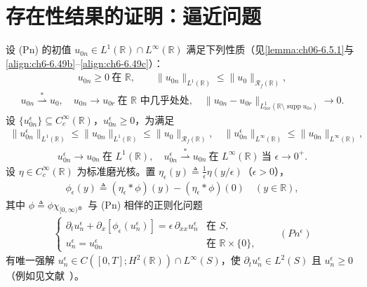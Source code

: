 \documentclass[../../main.tex]{subfiles}%
\begin{document}
\section{存在性结果的证明：逼近问题}\label{section:ch07-逼近问题}

设 (Pn) 的初值 $u_{0n}\in L^1(\mathbb{R})\cap L^\infty(\mathbb{R})$ 满足下列性质（见\cref{lemma:ch06-6.5.1}与\eqref{align:ch6-6.49b}--\eqref{align:ch6-6.49c}）：
\begin{align}
u_{0n}\geqslant0\ \text{在 }\mathbb{R},\qquad
\|u_{0n}\|_{L^1(\mathbb{R})}\leqslant\|u_0\|_{\mathscr{R}_f(\mathbb{R})}, \label{align:ch07-7.44}
\end{align}
\begin{align}
u_{0n}\stackrel{*}{\rightharpoonup}u_0,\quad
u_{0n}\to u_{0r}\ \text{在 }\mathbb{R}\text{ 中几乎处处},\quad
\|u_{0n}-u_{0r}\|_{L^1_{\mathrm{loc}}(\mathbb{R}\setminus\operatorname{supp}u_{0s})}\to0. \label{align:ch07-7.45}
\end{align}
设 $\{u_{0n}^\epsilon\}\subseteq C^\infty_c(\mathbb{R})$，$u_{0n}^\epsilon\geqslant0$，为满足
\begin{align}
\|u_{0n}^\epsilon\|_{L^1(\mathbb{R})}\leqslant\|u_{0n}\|_{L^1(\mathbb{R})}\leqslant\|u_0\|_{\mathscr{R}_f(\mathbb{R})},\quad
\|u_{0n}^\epsilon\|_{L^\infty(\mathbb{R})}\leqslant\|u_{0n}\|_{L^\infty(\mathbb{R})}, \label{align:ch07-7.46}
\end{align}
\begin{align}
u_{0n}^\epsilon\to u_{0n}\ \text{在 }L^1(\mathbb{R}),\quad
u_{0n}^\epsilon\stackrel{*}{\rightharpoonup}u_{0n}\ \text{在 }L^\infty(\mathbb{R})\ \text{当 }\epsilon\to0^+. \label{align:ch07-7.47}
\end{align}
设 $\eta\in C^\infty_c(\mathbb{R})$ 为标准磨光核。置 $\eta_\epsilon(y)\triangleq \frac1\epsilon\eta(y/\epsilon)$（$\epsilon>0$），
\begin{align}
\phi_\epsilon(y)\triangleq (\eta_\epsilon*\phi)(y)-(\eta_\epsilon*\phi)(0)\quad(y\in\mathbb{R}), \label{align:ch07-7.48}
\end{align}
其中 $\phi\triangleq \phi\chi_{[0,\infty)}$。与 (Pn) 相伴的正则化问题
\begin{align*}
\begin{cases}
\partial_t u_n^\epsilon+\partial_x[\phi_\epsilon(u_n^\epsilon)]=\epsilon\,\partial_{xx}u_n^\epsilon & \text{在 }S,\\
u_n^\epsilon=u_{0n}^\epsilon & \text{在 }\mathbb{R}\times\{0\},
\end{cases}
\qquad(Pn^\epsilon)
\end{align*}
有唯一强解 $u_n^\epsilon\in C([0,T];H^2(\mathbb{R}))\cap L^\infty(S)$，使 $\partial_t u_n^\epsilon\in L^2(S)$ 且 $u_n^\epsilon\geqslant0$（例如见文献~\cite{ref68}）。
\end{document}
